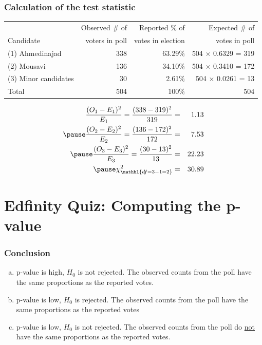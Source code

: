 \documentclass[slidestop,compress,mathserif]{beamer}
\begin{document}
\begin{frame}
\frametitle{Calculation of the test statistic}

{\small
\begin{center}
\begin{tabular}{l | r r r}
					& \footnotesize{Observed \# of} & \footnotesize{Reported \% of}	& \footnotesize{Expected \# of} \\
\footnotesize{Candidate}	& \footnotesize{voters in poll} & \footnotesize{votes in election}		&  \footnotesize{votes in poll} \\
\hline
\footnotesize{(1) Ahmedinajad}	& 338	& 63.29\% 	& 504 $\times$ 0.6329 = 319 \\
\footnotesize{(2) Mousavi}		& 136	& 34.10\%		& 504 $\times$ 0.3410 = 172 \\
\footnotesize{(3) Minor candidates}	& 30	& 2.61\% 		& 504 $\times$ 0.0261 = 13\\
\hline
Total			& 504	& 100\%		& 504
\end{tabular}
\end{center}
}

\pause

\begin{eqnarray*}
\frac{(O_1 - E_1)^2}{E_1} = \frac{(338 - 319)^2}{319} &=& 1.13 \\
\pause
\frac{(O_2 - E_2)^2}{E_2} = \frac{(136 - 172)^2}{172} &=& 7.53 \\
\pause
\frac{(O_3 - E_3)^2}{E_3} = \frac{(30 - 13)^2}{13} &=& 22.23 \\
\pause
 \chi^2_{\mathhl{df = 3 - 1 = 2}} &=& 30.89
\end{eqnarray*}


\end{frame}


\section{Edfinity Quiz: Computing the p-value}


\begin{frame}
\frametitle{Conclusion}


\begin{enumerate}[(a)]
\item p-value is high, $H_0$ is not rejected. The observed counts from the poll have the same proportions as the reported votes.
\item p-value is low, $H_0$ is rejected. The observed counts from the poll have the same proportions as the reported votes
\item p-value is low, $H_0$ is not rejected. The observed counts from the poll do \underline{not} have the same proportions as the reported votes.
\end{enumerate}

\end{frame}
\end{document}
